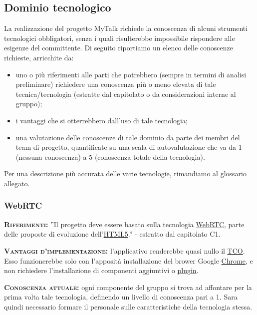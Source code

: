 \subsection{Dominio tecnologico}
La realizzazione del progetto MyTalk richiede la conoscenza di alcuni strumenti tecnologici obbligatori, senza i quali risulterebbe impossibile rispondere alle esigenze del committente. Di seguito riportiamo un elenco delle conoscenze richieste, arricchite da:

\begin{itemize}
	\item uno o più riferimenti alle parti che potrebbero (sempre in termini di analisi preliminare) richiedere una conoscenza più o meno elevata di tale tecnica/tecnologia (estratte dal capitolato o da considerazioni interne al gruppo);
	\item i vantaggi che si otterrebbero dall'uso di tale tecnologia;
	\item una valutazione delle conoscenze di tale dominio da parte dei membri del team di progetto, quantificate su una scala di autovalutazione che va da 1 (nessuna conoscenza) a 5 (conoscenza totale della tecnologia).
\end{itemize}
Per una descrizione più accurata delle varie tecnologie, rimandiamo al glossario allegato.

\subsubsection{WebRTC}
\begin{description}
	\item{\scshape\bfseries Riferimenti:} ''Il progetto deve essere basato sulla tecnologia \underline{WebRTC}, parte delle proposte di evoluzione dell'\underline{HTML5}.'' - estratto dal capitolato C1.

	\item{\scshape\bfseries Vantaggi d'implementazione:} l'applicativo renderebbe quasi nullo il \underline{TCO}. Esso funzionerebbe solo con l'apposità installazione del brower Google \underline{Chrome}, e non richiedere l'installazione di componenti aggiuntivi o \underline{plugin}.
	
	\item{\scshape\bfseries Conoscenza attuale:} ogni componente del gruppo si trova ad affontare per la prima volta tale tecnologia, definendo un livello di conoscenza pari a 1. Sara quindi necessario formare il personale sulle caratteristiche della tecnologia stessa.
\end{description}


